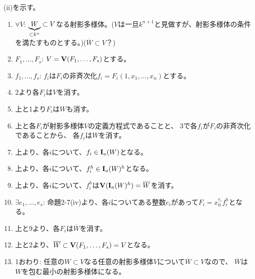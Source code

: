 \begin{myproof}
  (ii)を示す。
  \begin{enumerate}
    \item $\forall V$: $\underbrace{W}_{\subset k^n} \subset V$なる射影多様体。($V$は一旦$k^{n+1}$と見做すが、射影多様体の条件を満たすものとする。)($\overline W\subset V$？)
    \item $F_1,\dots,F_s$:
    $V=\textbf V(F_1,\dots,F_s)$とする。
    \item $f_1,\dots,f_s$:
    $f_i$は$F_i$の非斉次化$f_i = F_i(1,x_1,\dots,x_n)$とする。
    \item 2より各$F_i$は$V$を消す。
    \item 上と1より$F_i$は$W$も消す。
    \item 上と各$F_i$が射影多様体$V$の定義方程式であることと、
    3で各$f_i$が$F_i$の非斉次化であることから、
    各$f_i$は$W$を消す。
    \item
    上より、各$i$について、$f_i \in \textbf I_a(W)$となる。
    \item
    上より、各$i$について、$f_i^h \in \textbf I_a(W)^h$となる。
    \item
    上より、各$i$について、$f_i^h$は$\textbf V(\textbf I_a(W)^h) = \overline W$を消す。
    \item
    $\exists e_1,\dots,e_s$:
    命題2-7(iv)より、各$i$についてある整数$e_i$があって$F_i=x_0^{e_i}f_i^h$となる。
    \item
    上と9より、各$F_i$は$\overline W$を消す。
    \item
    上と2より、$\overline W \subset \textbf V(F_1,\dots,F_s) = V$となる。
    \item 1おわり:
    任意の$W\subset V$なる任意の射影多様体$V$について$\overline W\subset V$なので、
    $\overline W$は$W$を包む最小の射影多様体になる。
  \end{enumerate}


\end{myproof}
